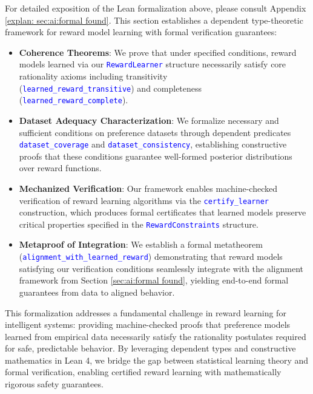 \documentclass{article}
\theoremstyle{definition}
\newcommand{\tactic}[1]{\textcolor{blue}{\texttt{#1}}}
\begin{document}
For detailed exposition of the Lean formalization above, please consult Appendix \ref{explan: sec:ai:formal found}. This section establishes a dependent type-theoretic framework for reward model learning with formal verification guarantees:

\begin{itemize}
  \item \textbf{Coherence Theorems}: We prove that under specified conditions, reward models learned via our \tactic{RewardLearner} structure necessarily satisfy core rationality axioms including transitivity\\ (\tactic{learned\_reward\_transitive}) and completeness (\tactic{learned\_reward\_complete}).

  \item \textbf{Dataset Adequacy Characterization}: We formalize necessary and sufficient conditions on preference datasets through dependent predicates \tactic{dataset\_coverage} and \tactic{dataset\_consistency}, establishing constructive proofs that these conditions guarantee well-formed posterior distributions over reward functions.

  \item \textbf{Mechanized Verification}: Our framework enables machine-checked verification of reward learning algorithms via the \tactic{certify\_learner} construction, which produces formal certificates that learned models preserve critical properties specified in the \tactic{RewardConstraints} structure.

  \item \textbf{Metaproof of Integration}: We establish a formal metatheorem (\tactic{alignment\_with\_learned\_reward}) demonstrating that reward models satisfying our verification conditions seamlessly integrate with the alignment framework from Section \ref{sec:ai:formal found}, yielding end-to-end formal guarantees from data to aligned behavior.
\end{itemize}

This formalization addresses a fundamental challenge in reward learning for intelligent systems: providing machine-checked proofs that preference models learned from empirical data necessarily satisfy the rationality postulates required for safe, predictable behavior. By leveraging dependent types and constructive mathematics in Lean 4, we bridge the gap between statistical learning theory and formal verification, enabling certified reward learning with mathematically rigorous safety guarantees.
\end{document}
